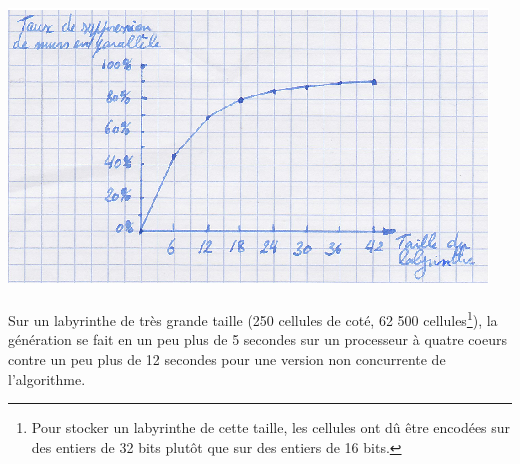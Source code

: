 \documentclass[a4paper,french]{article}
\begin{document}
    \begin{center}
        \includegraphics{schema_performances.eps}
    \end{center}

    \paragraph{} Sur un labyrinthe de très grande taille (250 cellules de coté,
62 500 cellules\footnote{Pour
stocker un labyrinthe de cette taille, les cellules ont dû être encodées sur des
entiers de 32 bits plutôt que sur des entiers de 16 bits.}), la génération se
fait en un peu plus de 5 secondes sur un processeur à quatre coeurs contre un
peu plus de 12 secondes pour une version non concurrente de l'algorithme.
\end{document}
